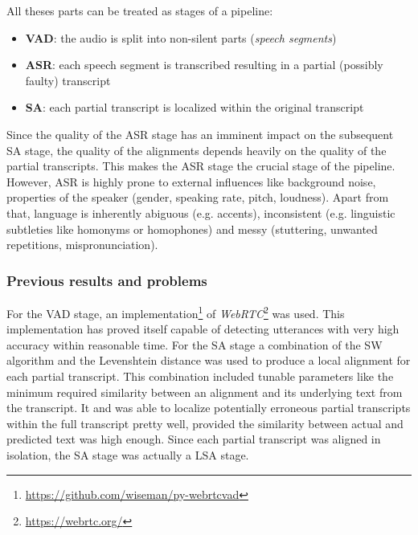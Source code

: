 All theses parts can be treated as stages of a pipeline:

\begin{itemize}
	\item \textbf{\ac{VAD}}: the audio is split into non-silent parts (\textit{speech segments})
	\item \textbf{\ac{ASR}}: each speech segment is transcribed resulting in a partial (possibly faulty) transcript
	\item \textbf{\ac{SA}}: each partial transcript is localized within the original transcript	
\end{itemize}

Since the quality of the \ac{ASR} stage has an imminent impact on the subsequent \ac{SA} stage, the quality of the alignments depends heavily on the quality of the partial transcripts. This makes the \ac{ASR} stage the crucial stage of the pipeline. However, \ac{ASR} is highly prone to external influences like background noise, properties of the speaker (gender, speaking rate, pitch, loudness). Apart from that, language is inherently abiguous (e.g. accents), inconsistent (e.g. linguistic subtleties like homonyms or homophones) and messy (stuttering, unwanted repetitions, mispronunciation).

\subsubsection{Previous results and problems}
For the \ac{VAD} stage, an implementation\footnote{\url{https://github.com/wiseman/py-webrtcvad}} of \textit{WebRTC}\footnote{\url{https://webrtc.org/}} was used. This implementation has proved itself capable of detecting utterances with very high accuracy within reasonable time. For the \ac{SA} stage a combination of the \ac{SW} algorithm and the Levenshtein distance was used to produce a local alignment for each partial transcript. This combination included tunable parameters like the minimum required similarity between an alignment and its underlying text from the transcript. It and was able to localize potentially erroneous partial transcripts within the full transcript pretty well, provided the similarity between actual and predicted text was high enough. Since each partial transcript was aligned in isolation, the \ac{SA} stage was actually a \ac{LSA} stage. 


